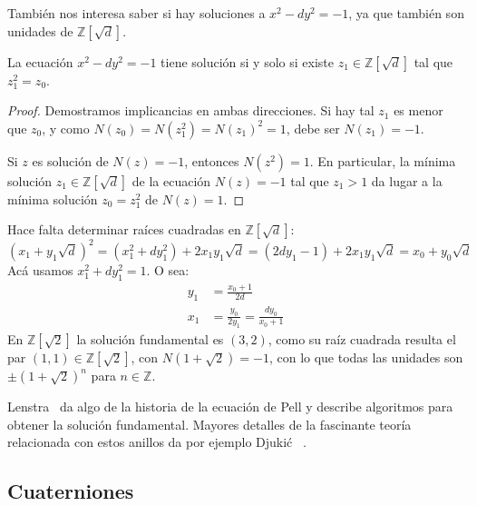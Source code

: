   También nos interesa saber
  si hay soluciones a \(x^2 - d y^2 = -1\),
  ya que también son unidades de \(\mathbb{Z}[\sqrt{d}]\).
  \begin{theorem}
    \label{theo:Pell-neg-soluble}
    La ecuación \(x^2 - d y^2 = -1\) tiene solución si y solo si
    existe \(z_1 \in \mathbb{Z}[\sqrt{d}]\)
    tal que \(z_1^2 = z_0\).
  \end{theorem}
  \begin{proof}
    Demostramos implicancias en ambas direcciones.
    Si hay tal \(z_1\)
    es menor que \(z_0\),
    y como \(N(z_0) = N(z_1^2) = N(z_1)^2 = 1\),
    debe ser \(N(z_1) = -1\).

    Si \(z\) es solución de \(N(z) = -1\),
    entonces \(N(z^2) = 1\).
    En particular,
    la mínima solución \(z_1 \in \mathbb{Z}[\sqrt{d}]\)
    de la ecuación \(N(z) = -1\) tal que \(z_1 > 1\)
    da lugar a la mínima solución \(z_0 = z_1^2\) de \(N(z) = 1\).
  \end{proof}
  Hace falta determinar raíces cuadradas en \(\mathbb{Z}[\sqrt{d}]\):
  \begin{equation*}
    (x_1 + y_1 \sqrt{d})^2
      = (x_1^2 + d y_1^2) + 2 x_1 y_1 \sqrt{d}
      = (2 d y_1 - 1) + 2 x_1 y_1 \sqrt{d}
      = x_0 + y_0 \sqrt{d}
  \end{equation*}
  Acá usamos \(x_1^2 + d y_1^2 = 1\).
  O sea:
  \begin{align*}
    y_1
      &= \frac{x_0 + 1}{2 d} \\
    x_1
      &= \frac{y_0}{2 y_1}
       = \frac{d y_0}{x_0 + 1}
  \end{align*}
  En \(\mathbb{Z}[\sqrt{2}]\) la solución fundamental es \((3, 2)\),
  como su raíz cuadrada resulta el par \((1, 1) \in \mathbb{Z}[\sqrt{2}]\),
  con \(N(1 + \sqrt{2}) = -1\),
  con lo que todas las unidades
  son \(\pm (1 + \sqrt{2})^n\) para \(n \in \mathbb{Z}\).

  Lenstra~%
    \cite{lenstra02:_solving_pell_equat}
  da algo de la historia de la ecuación de Pell%
  y describe algoritmos para obtener la solución fundamental.
  Mayores detalles de la fascinante teoría relacionada con estos anillos
  da por ejemplo Djukić~%
    \cite{djukic07:_arith_exten_Q}.

\subsection{Cuaterniones}
\label{sec:cuaterniones}

